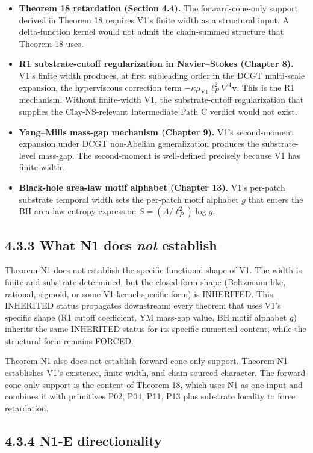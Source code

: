 \documentclass[11pt]{book}
\begin{document}
\begin{itemize}
\item \textbf{Theorem 18 retardation (Section 4.4).} The forward-cone-only support derived in Theorem 18 requires V1's finite width as a structural input. A delta-function kernel would not admit the chain-summed structure that Theorem 18 uses.
\item \textbf{R1 substrate-cutoff regularization in Navier–Stokes (Chapter 8).} V1's finite width produces, at first subleading order in the DCGT multi-scale expansion, the hyperviscous correction term $-\kappa\mu_\mathrm{V1}\ell_P^2 \nabla^4\mathbf{v}$. This is the R1 mechanism. Without finite-width V1, the substrate-cutoff regularization that supplies the Clay-NS-relevant Intermediate Path C verdict would not exist.
\item \textbf{Yang–Mills mass-gap mechanism (Chapter 9).} V1's second-moment expansion under DCGT non-Abelian generalization produces the substrate-level mass-gap. The second-moment is well-defined precisely because V1 has finite width.
\item \textbf{Black-hole area-law motif alphabet (Chapter 13).} V1's per-patch substrate temporal width sets the per-patch motif alphabet $g$ that enters the BH area-law entropy expression $S = (A/\ell_P^2)\log g$.
\end{itemize}

\subsection{4.3.3 What N1 does \textit{not} establish}

Theorem N1 does not establish the specific functional shape of V1. The width is finite and substrate-determined, but the closed-form shape (Boltzmann-like, rational, sigmoid, or some V1-kernel-specific form) is INHERITED. This INHERITED status propagates downstream: every theorem that uses V1's specific shape (R1 cutoff coefficient, YM mass-gap value, BH motif alphabet $g$) inherits the same INHERITED status for its specific numerical content, while the structural form remains FORCED.

Theorem N1 also does not establish forward-cone-only support. Theorem N1 establishes V1's existence, finite width, and chain-sourced character. The forward-cone-only support is the content of Theorem 18, which uses N1 as one input and combines it with primitives P02, P04, P11, P13 plus substrate locality to force retardation.

\subsection{4.3.4 N1-E directionality}
\end{document}
